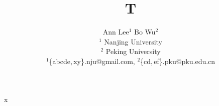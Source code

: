 \documentclass{article}
\title{T}
\author{Ann Lee$^{1}$ \quad Bo Wu$^{2}$ \\ $^1$ Nanjing University \\ $^2$ Peking University \\ $^1$\{abcde,\,xy\}.nju@gmail.com, $^2$\{cd,\,ef\}.pku@pku.edu.cn}
\begin{document}
\maketitle
x
\end{document}

